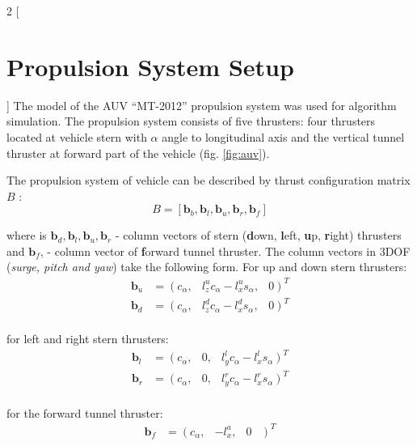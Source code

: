 \documentclass[a0,portrait]{a0poster}
\begin{document}
\begin{minipage}[t]{0.48\linewidth}
\begin{multicols}{2}
[
\section*{Propulsion System Setup}
]
The model of the AUV ``MT-2012'' \cite{auv_mt} propulsion system was used for algorithm simulation.
The propulsion system consists of five thrusters: four thrusters located at vehicle stern with $\alpha$ angle to longitudinal axis and the vertical tunnel thruster at forward part of the vehicle (fig. \ref{fig:auv}).

The propulsion system of vehicle can be described by thrust configuration matrix $B$ \cite{book_fossen}:
\begin{equation*}
B = [\boldsymbol{b}_b, \boldsymbol{b}_l, \boldsymbol{b}_u, \boldsymbol{b}_r, \boldsymbol{b}_f]
\end{equation*}

where is $\boldsymbol{b}_d, \boldsymbol{b}_l, \boldsymbol{b}_u, \boldsymbol{b}_r$ - column vectors of stern (\textbf{d}own, \textbf{l}eft, \textbf{u}p, \textbf{r}ight) 
thrusters and $\boldsymbol{b}_f$,  - column vector of \textbf{f}orward tunnel thruster.
The column vectors in 3DOF (\textit{surge, pitch and yaw}) take the following form.
For up and down stern thrusters:
\begin{equation*}
\begin{array}{ccccc}
\boldsymbol{b}_u &= \left(\right.
c_{\alpha},&
l_z^u c_{\alpha} - l_x^u s_{\alpha},&
0
\left.\right)^T \\
\boldsymbol{b}_d &= \left(\right.
c_{\alpha},&
l_z^d c_{\alpha} - l_x^d s_{\alpha},&
0
\left.\right)^T \\
\end{array}
\end{equation*}

for left and right stern thrusters:
\begin{equation*}
\begin{array}{ccccc}
\boldsymbol{b}_l &= \left(\right.
c_{\alpha},&
0,&
l_y^l c_{\alpha} - l_x^l s_{\alpha}
\left.\right)^T \\
\boldsymbol{b}_r &= \left(\right.
c_{\alpha},&
0,&
l_y^r c_{\alpha} - l_x^r s_{\alpha}
\left.\right)^T \\
\end{array}
\end{equation*}

for the forward tunnel thruster:
\begin{equation*}
\begin{array}{ccccc}
\boldsymbol{b}_f &= \left(\right.
c_{\alpha},&
-l_x^a,&
0&
\left.\right)^T \\
\end{array}
\end{equation*}


\end{multicols}
\end{minipage}
\end{document}
